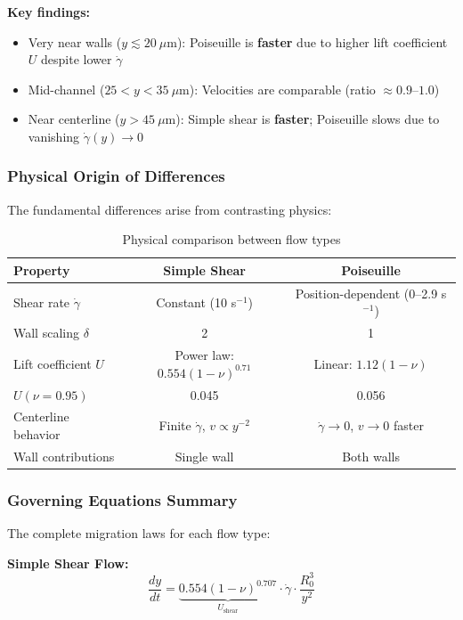 \documentclass{article}
\begin{document}
\textbf{Key findings:}
\begin{itemize}
    \item Very near walls ($y \lesssim 20~\mu\text{m}$): Poiseuille is \textbf{faster} due to higher lift coefficient $U$ despite lower $\dot{\gamma}$
    \item Mid-channel ($25 < y < 35~\mu\text{m}$): Velocities are comparable (ratio $\approx 0.9$--$1.0$)
    \item Near centerline ($y > 45~\mu\text{m}$): Simple shear is \textbf{faster}; Poiseuille slows due to vanishing $\dot{\gamma}(y) \to 0$
\end{itemize}

\subsubsection{Physical Origin of Differences}

The fundamental differences arise from contrasting physics:

\begin{table}[H]
\centering
\caption{Physical comparison between flow types}
\label{tab:physics_comparison}
\begin{tabular}{lcc}
\toprule
\textbf{Property} & \textbf{Simple Shear} & \textbf{Poiseuille} \\
\midrule
Shear rate $\dot{\gamma}$ & Constant (10 s$^{-1}$) & Position-dependent (0--2.9 s$^{-1}$) \\
Wall scaling $\delta$ & 2 & 1 \\
Lift coefficient $U$ & Power law: $0.554(1-\nu)^{0.71}$ & Linear: $1.12(1-\nu)$ \\
$U(\nu=0.95)$ & 0.045 & 0.056 \\
Centerline behavior & Finite $\dot{\gamma}$, $v \propto y^{-2}$ & $\dot{\gamma} \to 0$, $v \to 0$ faster \\
Wall contributions & Single wall & Both walls \\
\bottomrule
\end{tabular}
\end{table}

\subsubsection{Governing Equations Summary}

The complete migration laws for each flow type:

\textbf{Simple Shear Flow:}
\begin{equation}
    \frac{dy}{dt} = \underbrace{0.554(1-\nu)^{0.707}}_{U_{\text{shear}}} \cdot \dot{\gamma} \cdot \frac{R_0^3}{y^2}
    \label{eq:shear_complete}
\end{equation}
\end{document}
